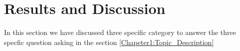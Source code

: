 
\chapter{Results and Discussion}

\label{Chapter6:Results}

 
 

In this section we have discussed three specific category to answer the three specfic question asking in the section \ref{Chapeter1:Topic_Description} 


